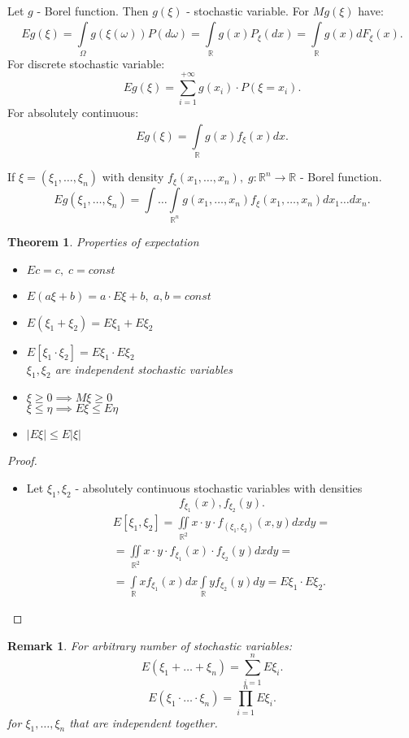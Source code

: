\documentclass[12pt,letterpaper]{report}
\newtheorem{theorem}{Theorem}
\newtheorem*{remark}{Remark}
\begin{document}
Let $g$ - Borel function. Then $g(\xi)$ - stochastic variable. For $Mg(\xi)$ have:
\[
    Eg(\xi) = \int\limits_{\Omega}^{} g(\xi(\omega)) P(d\omega) = \int\limits_{\mathbb{R}}^{} g(x) P_{\xi} (dx) = \int\limits_{\mathbb{R}}^{} g(x) dF_{\xi} (x) 
.\] 
For discrete stochastic variable:
\[
    Eg(\xi) = \sum_{i=1}^{+\infty} g(x_i) \cdot P(\xi = x_i)
.\] 
For absolutely continuous:
\[
    Eg(\xi) = \int\limits_{\mathbb{R}}^{} g(x) f_{\xi}(x)dx
.\] 

If $\xi = (\xi_1, \dots, \xi_n)$ with density $f_{\xi}(x_1, \dots, x_n), \; g : \mathbb{R}^{n} \to \mathbb{R} $ - Borel function.
\[
    Eg(\xi_1, \dots, \xi_n) = \int \dots \int\limits_{\mathbb{R}^n} g(x_1, \dots, x_n) f_{\xi}(x_1, \dots, x_n) dx_1 \dots dx_n
.\] 

\begin{theorem} Properties of expectation \\

    \begin{itemize}
        \item[1.] $ Ec = c, \; c = const $
    \item[2.] $ E(a\xi + b) = a \cdot E\xi + b, \; a,b = const $
    \item[3.] $ E(\xi_1 + \xi_2) = E\xi_1 + E\xi_2 $
    \item[4.] $ E[\xi_1 \cdot \xi_2] = E\xi_1 \cdot E\xi_2 $ \\
        $\xi_1, \xi_2$ are independent stochastic variables 
    \item[5.] $\xi \geq 0 \implies M\xi \geq 0$ \\
        $ \xi \leq \eta \implies E\xi \leq E\eta $
    \item [6.] $ |E\xi| \leq E|\xi| $
    \end{itemize}
\end{theorem}
\begin{proof}
    \begin{itemize}
        \item[4.] Let $\xi_1, \xi_2$ - absolutely continuous stochastic variables with densities
            \[
                f_{\xi_1}(x), f_{\xi_2}(y)
            .\] 
            \begin{align*}
                E[\xi_1, \xi_2] = \iint\limits_{\mathbb{R}^2} x \cdot y \cdot f_{(\xi_1,\xi_2)}(x,y)dx dy = \\
                = \iint\limits_{\mathbb{R}^2} x \cdot y \cdot f_{\xi_1}(x) \cdot f_{\xi_2}(y) dx dy = \\
                = \int\limits_{\mathbb{R}}^{} x f_{\xi_1}(x)dx \int\limits_{\mathbb{R}}^{} y f_{\xi_2}(y) dy = E\xi_1 \cdot E\xi_2
            .\end{align*}
    \end{itemize}
\end{proof}
\begin{remark}
    For arbitrary number of stochastic variables:
    \[
        E(\xi_1 + \dots + \xi_n) = \sum_{i=1}^{n} E\xi_i
    .\] 
    \[
        E(\xi_1 \cdot \dots \cdot \xi_n) = \prod_{i=1}^{n} E\xi_i 
    .\] 
    for $\xi_1, \dots, \xi_n$ that are independent together.
\end{remark}
\end{document}
